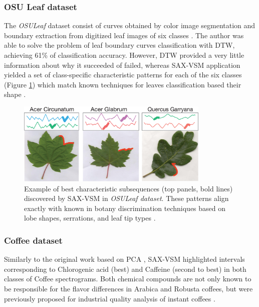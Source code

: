 \documentclass[conference]{IEEEtran}
\begin{document}
\subsubsection{OSU Leaf dataset}
The \textit{OSULeaf} dataset consist of curves obtained by color image segmentation 
and boundary extraction from digitized leaf images of six classes \cite{osuleaf}.
The author was able to solve the problem of leaf boundary curves classification 
with DTW, achieving 61\% of classification accuracy. 
However, DTW provided a very little information about why it succeeded of failed,
whereas SAX-VSM application yielded a set of class-specific characteristic 
patterns for each of the six classes (Figure \ref{fig:shapelet-acer-patterns}) which 
match known techniques for leaves classification based their shape \cite{dirr}. 

\begin{figure}[t]
   \centering
   \vspace{-0.2cm}
   \includegraphics[width=92mm]{figures/AcerCircunatum-short.eps}
   \caption{Example of best characteristic subsequences (top panels, bold lines) discovered 
   by SAX-VSM in \textit{OSULeaf dataset}.
    These patterns align exactly with known in botany discrimination techniques based on lobe shapes, 
    serrations, and leaf tip types \cite{dirr}.}
   \label{fig:shapelet-acer-patterns}
   \vspace{-0.2cm}
\end{figure}

\subsubsection{Coffee dataset}
Similarly to the original work based on PCA \cite{coffee}, SAX-VSM highlighted intervals 
corresponding to Chlorogenic acid (best) and Caffeine (second to best) 
in both classes of Coffee spectrograms. Both chemical compounds are 
not only known to be responsible for the flavor differences in 
Arabica and Robusta coffees, but were previously proposed for industrial 
quality analysis of instant coffees \cite{coffee}.
\end{document}
